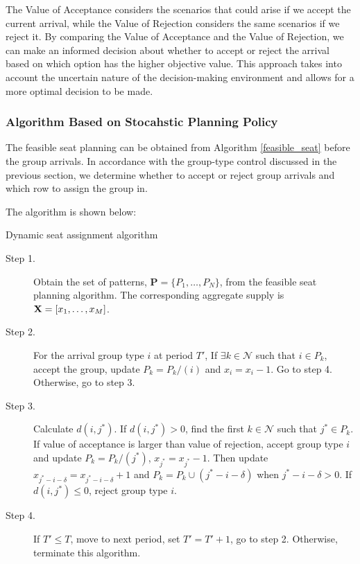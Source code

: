The Value of Acceptance considers the scenarios that could arise if we accept the current arrival, while the Value of Rejection considers the same scenarios if we reject it. By comparing the Value of Acceptance and the Value of Rejection, we can make an informed decision about whether to accept or reject the arrival based on which option has the higher objective value. This approach takes into account the uncertain nature of the decision-making environment and allows for a more optimal decision to be made.

\subsubsection{Algorithm Based on Stocahstic Planning Policy}
The feasible seat planning can be obtained from Algorithm \ref{feasible_seat} before the group arrivals. In accordance with the group-type control discussed in the previous section, we determine whether to accept or reject group arrivals and which row to assign the group in.

The algorithm is shown below:

\begin{algorithm}[H]
  \caption{Dynamic seat assignment algorithm}\label{algo_dynamic_policy}
  \begin{description}
    \item[Step 1.] Obtain the set of patterns, $\mathbf{P} = \{P_1,\ldots,P_{N}\}$, from the feasible seat planning algorithm. The corresponding aggregate supply is $\mathbf{X} = [x_{1}, \ldots, x_{M}]$.
    \item[Step 2.] For the arrival group type $i$ at period $T{'}$, 
    If $\exists k \in \mathcal{N}$ such that $i \in P_k$, accept the group, update $P_{k} = P_{k}/(i)$ and $x_{i} = x_{i} -1$. Go to step 4. Otherwise, go to step 3.
    \item[Step 3.] Calculate $d(i,j^{*})$. If $d(i,j^{*})>0$, find the first $k \in \mathcal{N}$ such that $j^{*} \in P_k$. If value of acceptance is larger than value of rejection, accept group type $i$ and update $P_{k} = P_{k}/(j^{*})$, $x_{j^{*}} = x_{j^{*}} -1$. Then update $x_{j^{*}-i-\delta} = x_{j^{*}-i-\delta} + 1$ and $P_{k}= P_{k} \cup (j^{*}-i-\delta)$ when $j^{*}-i-\delta > 0$. If $d(i,j^{*}) \leq 0$, reject group type $i$.
    \item[Step 4.] If $T{'} \leq T$, move to next period, set $T{'} = T{'}+1$, go to step 2. Otherwise, terminate this algorithm.
  \end{description}
\end{algorithm}

